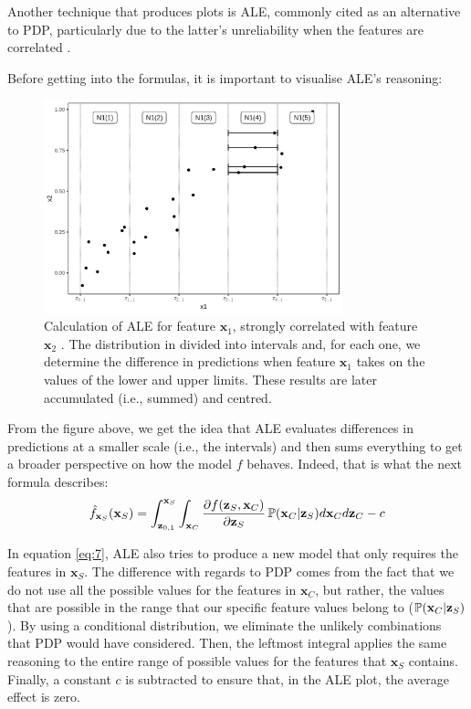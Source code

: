Another technique that produces plots is \ac{ALE}, commonly cited as an alternative to \ac{PDP}, particularly due to the latter's unreliability when the features are correlated \cite{ale}.

Before getting into the formulas, it is important to visualise \ac{ALE}'s reasoning:

\begin{figure}[h]
\centering
\includegraphics[width=245pt]{figures/figure_17.pdf}
\caption{Calculation of \ac{ALE} for feature $\mathbf{x}_1$, strongly correlated with feature $\mathbf{x}_2$ \cite{molnar2019}. The distribution in divided into intervals and, for each one, we determine the difference in predictions when feature $\mathbf{x}_1$ takes on the values of the lower and upper limits. These results are later accumulated (i.e., summed) and centred.}
\label{fig:accumulated_local_effects_grid}
\end{figure}

From the figure above, we get the idea that \ac{ALE} evaluates differences in predictions at a smaller scale (i.e., the intervals) and then sums everything to get a broader perspective on how the model $f$ behaves. Indeed, that is what the next formula describes:
\begin{equation}
    \hat{f}_{\mathbf{x}_{S}}(\mathbf{x}_{S}) = \int_{\mathbf{z}_{0,1}}^{\mathbf{x}_{S}} \int_{\mathbf{x}_{C}}^{} \frac{\partial f(\mathbf{z}_{S},\mathbf{x}_{C})}{\partial \mathbf{z}_{S}} \operatorname{\mathbb{P}} (\mathbf{x}_{C}|\mathbf{z}_{S}) d \mathbf{x}_{C} d \mathbf{z}_{C} - c
    \label{eq:7}
\end{equation}

In equation \ref{eq:7}, \ac{ALE} also tries to produce a new model that only requires the features in $\mathbf{x}_{S}$. The difference with regards to \ac{PDP} comes from the fact that we do not use all the possible values for the features in $\mathbf{x}_{C}$, but rather, the values that are possible in the range that our specific feature values belong to ($ \operatorname{\mathbb{P}} (\mathbf{x}_{C}|\mathbf{z}_{S})$). By using a conditional distribution, we eliminate the unlikely combinations that \ac{PDP} would have considered. Then, the leftmost integral applies the same reasoning to the entire range of possible values for the features that $\mathbf{x}_{S}$ contains. Finally, a constant $c$ is subtracted to ensure that, in the \ac{ALE} plot, the average effect is zero. \\

